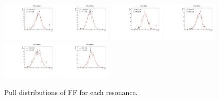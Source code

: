 \begin{figure}[h]
    \includegraphics[width=0.24\textwidth]{figure/io_full_sim/fitfrac/pull_fitfrac_res7_comb.pdf}
    \includegraphics[width=0.24\textwidth]{figure/io_full_sim/fitfrac/pull_fitfrac_res8_comb.pdf}
    \includegraphics[width=0.24\textwidth]{figure/io_full_sim/fitfrac/pull_fitfrac_res9_comb.pdf}
    \includegraphics[width=0.24\textwidth]{figure/io_full_sim/fitfrac/pull_fitfrac_res10_comb.pdf}
    \includegraphics[width=0.24\textwidth]{figure/io_full_sim/fitfrac/pull_fitfrac_res11_comb.pdf}
    \includegraphics[width=0.24\textwidth]{figure/io_full_sim/fitfrac/pull_fitfrac_res12_comb.pdf}
    \caption{Pull distributions of FF for each resonance.}
\label{fig:io_wo_bkg_pull_ff}
\end{figure}

